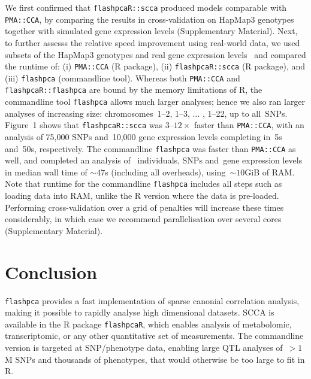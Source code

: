 \documentclass{bioinfo}
\begin{document}
We first confirmed that \texttt{flashpcaR::scca} produced models comparable
with \texttt{PMA::CCA}, by comparing the results in cross-validation on HapMap3
genotypes together with simulated gene expression levels (Supplementary
Material).  Next, to further assesss the relative speed improvement using
real-world data, we used subsets of the HapMap3 genotypes and real gene
expression levels~\citep{Stranger2012} and compared the runtime of: (i)
\texttt{PMA::CCA} (\textsf{R} package), (ii) \texttt{flashpcaR::scca}
(\textsf{R} package), and (iii) \texttt{flashpca} (commandline tool).
Whereas both \texttt{PMA::CCA} and \texttt{flashpcaR::flashpca} are bound by
the memory limitations of \textsf{R}, the commandline tool \texttt{flashpca}
allows much larger analyses; hence we also ran larger analyses of increasing
size: chromosomes~1--2, 1--3, $\hdots$ , 1--22, up to all~\nsnps SNPs.
Figure~1\vphantom{\ref{fig:01}} shows that \texttt{flashpcaR::scca} was
$3\text{--}12\times$ faster than \texttt{PMA::CCA}, with an analysis
of 75,000 SNPs and~10,000 gene expression levels completing in~5s
and~50s, respectively. The commandline \texttt{flashpca} was faster
than \texttt{PMA::CCA} as well, and completed an analysis of~\nindiv
individuals, \nsnps SNPs and~\ngenes gene expression levels in median wall
time of ${\sim}47$s (including all overheads), using~${\sim}10$GiB of RAM.
Note that runtime for the commandline \texttt{flashpca} includes all steps
such as loading data into RAM, unlike the \textsf{R} version where the data
is pre-loaded.  Performing cross-validation over a grid of penalties will
increase these times considerably, in which case we recommend parallelisation
over several cores (Supplementary Material).\vspace*{-12pt}

\section{Conclusion}

\texttt{flashpca} provides a fast implementation of sparse canonial correlation
analysis, making it possible to rapidly analyse high dimensional datasets.
SCCA is available in the \textsf{R} package \texttt{flashpcaR}, which enables
analysis of metabolomic, transcriptomic, or any other quantitative set of
measurements. The commandline version is targeted at SNP/phenotype data,
enabling large QTL analyses of~${>}1$M SNPs and thousands of phenotypes,
that would otherwise be too large to fit in \textsf{R}.\vspace*{-12pt}
\end{document}
